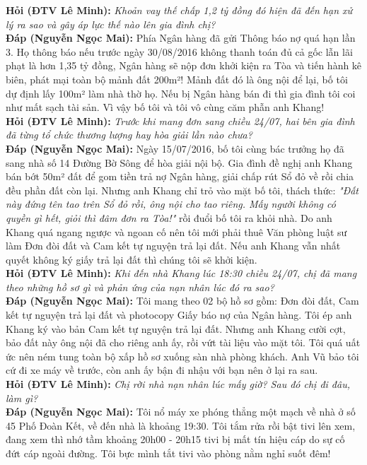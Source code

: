 \documentclass[12pt,a4paper]{article}
\begin{document}
\noindent\textbf{Hỏi (ĐTV Lê Minh):} \textit{Khoản vay thế chấp 1,2 tỷ đồng đó hiện đã đến hạn xử lý ra sao và gây áp lực thế nào lên gia đình chị?}\\[0.15cm]
\noindent\textbf{Đáp (Nguyễn Ngọc Mai):} Phía Ngân hàng đã gửi Thông báo nợ quá hạn lần 3. Họ thông báo nếu trước ngày 30/08/2016 không thanh toán đủ cả gốc lẫn lãi phạt là hơn 1,35 tỷ đồng, Ngân hàng sẽ nộp đơn khởi kiện ra Tòa và tiến hành kê biên, phát mại toàn bộ mảnh đất 200m²! Mảnh đất đó là ông nội để lại, bố tôi dự định lấy 100m² làm nhà thờ họ. Nếu bị Ngân hàng bán đi thì gia đình tôi coi như mất sạch tài sản. Vì vậy bố tôi và tôi vô cùng căm phẫn anh Khang!\\[0.35cm]

\noindent\textbf{Hỏi (ĐTV Lê Minh):} \textit{Trước khi mang đơn sang chiều 24/07, hai bên gia đình đã từng tổ chức thương lượng hay hòa giải lần nào chưa?}\\[0.15cm]
\noindent\textbf{Đáp (Nguyễn Ngọc Mai):} Ngày 15/07/2016, bố tôi cùng bác trưởng họ đã sang nhà số 14 Đường Bờ Sông để hòa giải nội bộ. Gia đình đề nghị anh Khang bán bớt 50m² đất để gom tiền trả nợ Ngân hàng, giải chấp rút Sổ đỏ về rồi chia đều phần đất còn lại. Nhưng anh Khang chỉ trỏ vào mặt bố tôi, thách thức: \textit{"Đất này đứng tên tao trên Sổ đỏ rồi, ông nội cho tao riêng. Mấy người không có quyền gì hết, giỏi thì đâm đơn ra Tòa!"} rồi đuổi bố tôi ra khỏi nhà. Do anh Khang quá ngang ngược và ngoan cố nên tôi mới phải thuê Văn phòng luật sư làm Đơn đòi đất và Cam kết tự nguyện trả lại đất. Nếu anh Khang vẫn nhất quyết không ký giấy trả lại đất thì chúng tôi sẽ khởi kiện.\\[0.35cm]

\noindent\textbf{Hỏi (ĐTV Lê Minh):} \textit{Khi đến nhà Khang lúc 18:30 chiều 24/07, chị đã mang theo những hồ sơ gì và phản ứng của nạn nhân lúc đó ra sao?}\\[0.15cm]
\noindent\textbf{Đáp (Nguyễn Ngọc Mai):} Tôi mang theo 02 bộ hồ sơ gồm: Đơn đòi đất, Cam kết tự nguyện trả lại đất và photocopy Giấy báo nợ của Ngân hàng. Tôi ép anh Khang ký vào bản Cam kết tự nguyện trả lại đất. Nhưng anh Khang cười cợt, bảo đất này ông nội đã cho riêng anh ấy, rồi vứt tài liệu vào mặt tôi. Tôi quá uất ức nên ném tung toàn bộ xấp hồ sơ xuống sàn nhà phòng khách. Anh Vũ bảo tôi cứ đi xe máy về trước, còn anh ấy bận đi nhậu với bạn nên ở lại ra sau.\\[0.35cm]

\noindent\textbf{Hỏi (ĐTV Lê Minh):} \textit{Chị rời nhà nạn nhân lúc mấy giờ? Sau đó chị đi đâu, làm gì?}\\[0.15cm]
\noindent\textbf{Đáp (Nguyễn Ngọc Mai):} Tôi nổ máy xe phóng thẳng một mạch về nhà ở số 45 Phố Đoàn Kết, về đến nhà là khoảng 19:30. Tôi tắm rửa rồi bật tivi lên xem, đang xem thì nhớ tầm khoảng 20h00 - 20h15 tivi bị mất tín hiệu cáp do sự cố đứt cáp ngoài đường. Tôi bực mình tắt tivi vào phòng nằm nghỉ suốt đêm!\\[0.35cm]
\end{document}
